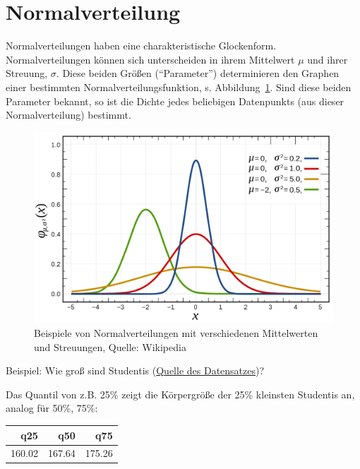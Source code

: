 \documentclass[
  a4paper,
  DIV=11]{scrreprt}
\theoremstyle{definition}
\theoremstyle{remark}
\begin{document}
\hypertarget{normalverteilung}{%
\section{Normalverteilung}\label{normalverteilung}}

Normalverteilungen haben eine charakteristische Glockenform.
Normalverteilungen können sich unterscheiden in ihrem Mittelwert \(\mu\)
und ihrer Streuung, \(\sigma\). Diese beiden Größen (``Parameter'')
determinieren den Graphen einer bestimmten Normalverteilungsfunktion, s.
Abbildung~\ref{fig-norms}. Sind diese beiden Parameter bekannt, so ist
die Dichte jedes beliebigen Datenpunkts (aus dieser Normalverteilung)
bestimmt.

\begin{figure}

{\centering \includegraphics{./img/normals.png}

}

\caption{\label{fig-norms}Beispiele von Normalverteilungen mit
verschiedenen Mittelwerten und Streuungen, Quelle: Wikipedia}

\end{figure}

Beispiel: Wie groß sind Studentis
(\href{https://rdrr.io/cran/openintro/man/speed_gender_height.html}{Quelle
des Datensatzes})?

Das Quantil von z.B. 25\% zeigt die Körpergröße der 25\% kleinsten
Studentis an, analog für 50\%, 75\%:

\begin{longtable}{rrr}
\toprule
q25 & q50 & q75 \\ 
\midrule
160.02 & 167.64 & 175.26 \\ 
\bottomrule
\end{longtable}
\end{document}
